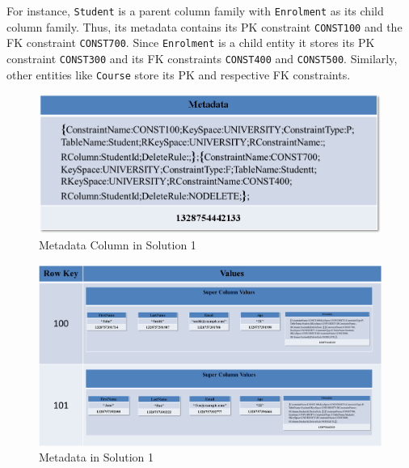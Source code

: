 For instance,  \texttt{Student}  is a parent column family with
\texttt{Enrolment} as its child column family. 
Thus,  its metadata  contains its \ac{PK} constraint \texttt{CONST100} and
the \ac{FK} constraint \texttt{CONST700}.  Since \texttt{Enrolment} is a child entity
it  stores its \ac{PK} constraint \texttt{CONST300} and its \ac{FK} constraints
\texttt{CONST400} and \texttt{CONST500}.  Similarly,  other entities like
\texttt{Course} store its \ac{PK} and respective \ac{FK} constraints. 

	\begin{figure}[h] 
			\centering
				\includegraphics[width=.8\textwidth]{./figure/Solutions/Sol1-MD-Col.png}
				\caption{Metadata Column in Solution 1}
				\label{fd:Metadata-Column}
	\end{figure}
	
	\begin{figure}
		\begin{landscape}
			\centering
			\includegraphics[width=1\textwidth]{./figure/Solutions/Sol1-MD-ColumnFamily.png}
			
			\caption{Metadata in Solution 1}\label{fd:Metadata-Solution1}
			\end{landscape}
		\end{figure}
	
% 	
		
